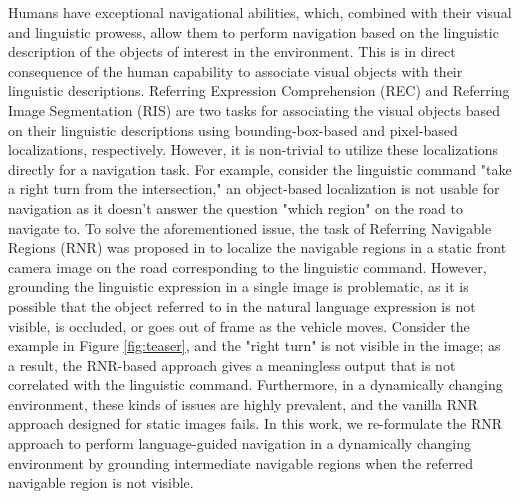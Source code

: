 \documentclass[11pt]{article}
\begin{document}
Humans have exceptional navigational abilities, which, combined with their visual and linguistic prowess, allow them to perform navigation based on the linguistic description of the objects of interest in the environment. This is in direct consequence of the human capability to associate visual objects with their linguistic descriptions. Referring Expression Comprehension (REC) and Referring Image Segmentation (RIS) are two tasks for associating the visual objects based on their linguistic descriptions using bounding-box-based and pixel-based localizations, respectively. However, it is non-trivial to utilize these localizations directly for a navigation task. For example, consider the linguistic command "take a right turn from the intersection," an object-based localization is not usable for navigation as it doesn't answer the question "which region" on the road to navigate to. To solve the aforementioned issue, the task of Referring Navigable Regions (RNR) was proposed in \cite{Rufus_2021} to localize the navigable regions in a static front camera image on the road corresponding to the linguistic command. However, grounding the linguistic expression in a single image is problematic, as it is possible that the object referred to in the natural language expression is not visible, is occluded, or goes out of frame as the vehicle moves. Consider the example in Figure \ref{fig:teaser}, and the "right turn" is not visible in the image; as a result, the RNR-based approach gives a meaningless output that is not correlated with the linguistic command. Furthermore, in a dynamically changing environment, these kinds of issues are highly prevalent, and the vanilla RNR approach designed for static images fails. In this work, we re-formulate the RNR approach to perform language-guided navigation in a dynamically changing environment by grounding intermediate navigable regions when the referred navigable region is not visible.
\end{document}
